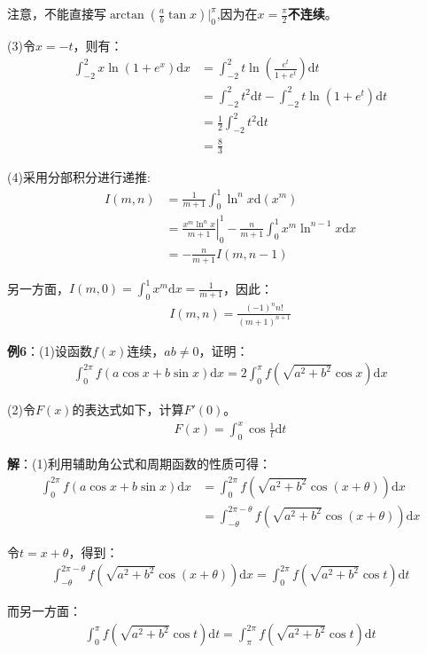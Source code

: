 \documentclass{ctexart}
\let\oldtextbf\textbf %
\renewcommand{\textbf}[1]{\textcolor{btex}{\oldtextbf{#1}}} %
\begin{document}
注意，不能直接写$\arctan(\frac{a}{b}\tan x)|_0^\pi$,因为在$x=\frac{\pi}{2}$\textbf{不连续}。

(3)令$x=-t$，则有：
\begin{align*}
\int_{-2}^2 x\ln(1+e^x)\mathrm{d}x&=\int_{-2}^2 t\ln(\frac{e^t}{1+e^t})\mathrm{d}t\\
&=\int_{-2}^2t^2\mathrm{d}t-\int_{-2}^2t\ln(1+e^t)\mathrm{d}t\\
&=\frac{1}{2}\int_{-2}^2t^2\mathrm{d}t\\
&=\frac{8}{3}  
\end{align*}

(4)采用分部积分进行递推:
\begin{align*}
I(m,n)&=\frac{1}{m+1}\int_0^1\ln^n x\mathrm{d}(x^m)\\
&=\left.\frac{x^m\ln^nx}{m+1}\right|_0^1-\frac{n}{m+1}\int_0^1x^m\ln^{n-1}x \mathrm{d}x\\
&=-\frac{n}{m+1}I(m,n-1)     
\end{align*}

另一方面，$I(m,0)=\int_0^1 x^m\mathrm{d}x=\frac{1}{m+1}$，因此：
\begin{align*}
    I(m,n)=\frac{(-1)^nn!}{(m+1)^{n+1}}
\end{align*}

\textbf{例6}：(1)设函数$f(x)$连续，$ab\neq 0$，证明：
\begin{align*}
    \int_0^{2\pi}f(a\cos x+b\sin x)\mathrm{d}x=2\int_0^\pi f(\sqrt{a^2+b^2}\cos x)\mathrm{d}x
\end{align*}

(2)令$F(x)$的表达式如下，计算$F'(0)$。
\begin{align*}
    F(x)=\int_0^x\cos\frac{1}{t}\mathrm{d}t
\end{align*}


\textbf{解}：(1)利用辅助角公式和周期函数的性质可得：
\begin{align*}
\int_0^{2\pi}f(a\cos x+b\sin x)\mathrm{d}x&=\int_0^{2\pi} f(\sqrt{a^2+b^2}\cos (x+\theta))\mathrm{d}x\\
&=\int_{-\theta}^{2\pi-\theta} f(\sqrt{a^2+b^2}\cos (x+\theta))\mathrm{d}x
\end{align*}

令$t=x+\theta$，得到：
\begin{align*}
\int_{-\theta}^{2\pi-\theta} f(\sqrt{a^2+b^2}\cos (x+\theta))\mathrm{d}x=\int_{0}^{2\pi} f(\sqrt{a^2+b^2}\cos t)\mathrm{d}t
\end{align*}

而另一方面：
\begin{align*}
\int_{0}^{\pi} f(\sqrt{a^2+b^2}\cos t)\mathrm{d}t=\int_{\pi}^{2\pi} f(\sqrt{a^2+b^2}\cos t)\mathrm{d}t
\end{align*}
\end{document}
